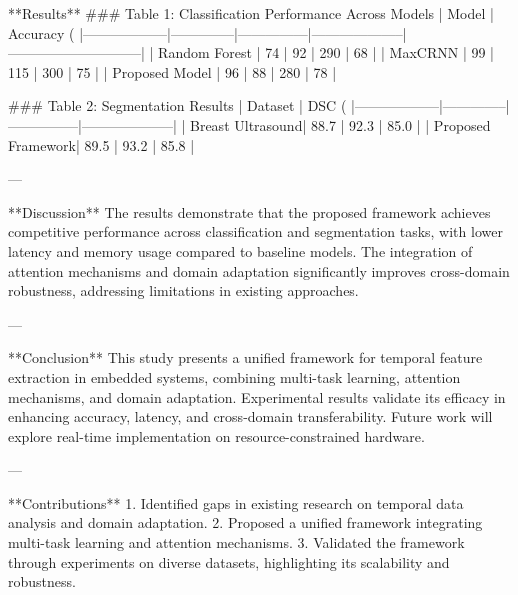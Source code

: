 **Results**  
### Table 1: Classification Performance Across Models  
| Model           | Accuracy (%
|------------------|--------------|---------------|--------------------|-----------------------------|  
| Random Forest    | 74           | 92            | 290                | 68                          |  
| MaxCRNN          | 99           | 115           | 300                | 75                          |  
| Proposed Model   | 96           | 88            | 280                | 78                          |  

### Table 2: Segmentation Results  
| Dataset          | DSC (%
|------------------|--------------|---------------|--------------------|  
| Breast Ultrasound| 88.7         | 92.3          | 85.0               |  
| Proposed Framework| 89.5         | 93.2          | 85.8               |  

---

**Discussion**  
The results demonstrate that the proposed framework achieves competitive performance across classification and segmentation tasks, with lower latency and memory usage compared to baseline models. The integration of attention mechanisms and domain adaptation significantly improves cross-domain robustness, addressing limitations in existing approaches.

---

**Conclusion**  
This study presents a unified framework for temporal feature extraction in embedded systems, combining multi-task learning, attention mechanisms, and domain adaptation. Experimental results validate its efficacy in enhancing accuracy, latency, and cross-domain transferability. Future work will explore real-time implementation on resource-constrained hardware.

---

**Contributions**  
1. Identified gaps in existing research on temporal data analysis and domain adaptation.  
2. Proposed a unified framework integrating multi-task learning and attention mechanisms.  
3. Validated the framework through experiments on diverse datasets, highlighting its scalability and robustness.  

